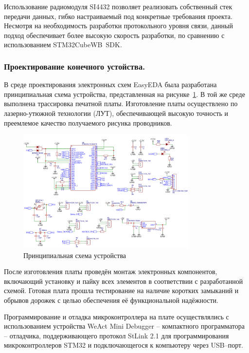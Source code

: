 \documentclass[a4paper,12pt]{article}
\begin{document}
Использование радиомодуля SI4432 позволяет реализовать собственный стек передачи данных, гибко настраиваемый под конкретные требования проекта. Несмотря на необходимость разработки
протокольного уровня связи, данный подход обеспечивает более высокую скорость разработки, по сравнению с использованием STM32CubeWB~SDK.

\subsubsection{Проектирование конечного устойства.}

В среде проектирования электронных схем EasyEDA была разработана принципиальная схема устройства, представленная на рисунке~\ref{fig:STM32_schematic}. В той же среде выполнена
трассировка печатной платы. Изготовление платы осуществлено по лазерно-утюжной технологии (ЛУТ), обеспечивающей высокую точность и преемлемое качество получаемого рисунка проводников.

\begin{figure}[H]
    \centering
    \includegraphics[width=0.8\textwidth]{images/STM32_schematic.png}
    \caption{Принципиальная схема устройства}
    \label{fig:STM32_schematic}
\end{figure}

После изготовления платы проведён монтаж электронных компонентов, включающий установку и пайку всех элементов в соответствии с разработанной схемой. Готовая плата прошла тестирование
на наличие коротких замыканий и обрывов дорожек с целью обеспечения её функциональной надёжности.

Программирование и отладка микроконтроллера на плате осуществлялись с использованием устройства WeAct Mini Debugger -- компактного программатора -- отладчика, поддерживающего протокол
StLink 2.1 для программирования микроконтроллеров STM32 и подключающегося к компьютеру через USB--порт.
\end{document}
